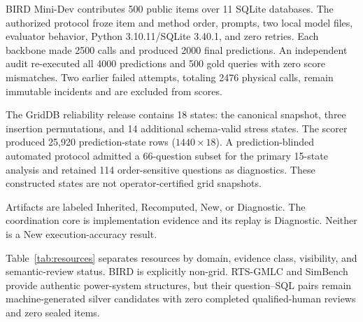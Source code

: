 \documentclass[applsci,article,submit,moreauthors]{Definitions/mdpi}
\begin{document}
BIRD Mini-Dev contributes 500 public items over 11 SQLite databases. The authorized protocol froze item and method order, prompts, two local model files, evaluator behavior, Python 3.10.11/SQLite 3.40.1, and zero retries. Each backbone made 2500 calls and produced 2000 final predictions. An independent audit re-executed all 4000 predictions and 500 gold queries with zero score mismatches. Two earlier failed attempts, totaling 2476 physical calls, remain immutable incidents and are excluded from scores.

The GridDB reliability release contains 18 states: the canonical snapshot, three insertion permutations, and 14 additional schema-valid stress states. The scorer produced 25,920 prediction-state rows ($1440\times18$). A prediction-blinded automated protocol admitted a 66-question subset for the primary 15-state analysis and retained 114 order-sensitive questions as diagnostics. These constructed states are not operator-certified grid snapshots.

Artifacts are labeled Inherited, Recomputed, New, or Diagnostic. The coordination core is implementation evidence and its replay is Diagnostic. Neither is a New execution-accuracy result.

Table~\ref{tab:resources} separates resources by domain, evidence class, visibility, and semantic-review status. BIRD is explicitly non-grid. RTS-GMLC and SimBench provide authentic power-system structures, but their question--SQL pairs remain machine-generated silver candidates with zero completed qualified-human reviews and zero sealed items.
\end{document}
